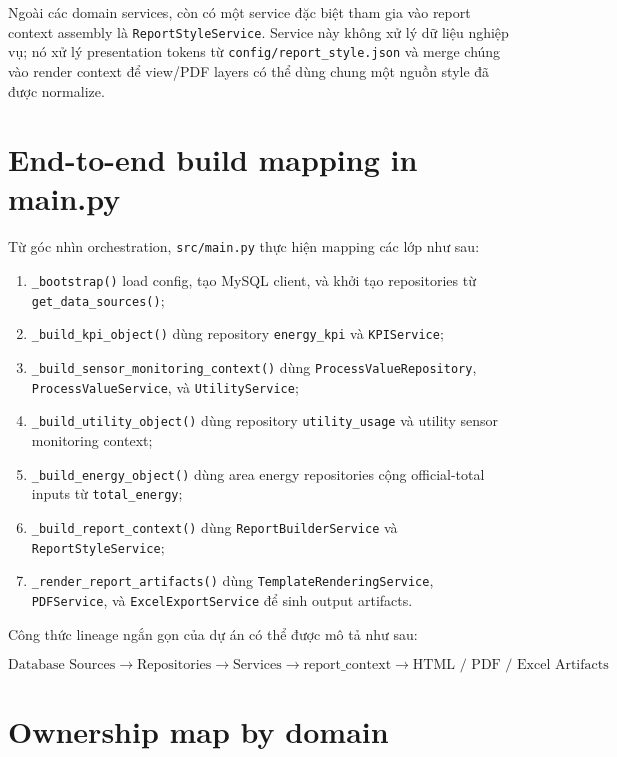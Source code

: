 Ngoài các domain services, còn có một service đặc biệt tham gia vào report context assembly là \texttt{ReportStyleService}. Service này không xử lý dữ liệu nghiệp vụ; nó xử lý presentation tokens từ \texttt{config/report\_style.json} và merge chúng vào render context để view/PDF layers có thể dùng chung một nguồn style đã được normalize.

\section{End-to-end build mapping in main.py}

Từ góc nhìn orchestration, \texttt{src/main.py} thực hiện mapping các lớp như sau:

\begin{enumerate}[label=-]
\item \texttt{\_bootstrap()} load config, tạo MySQL client, và khởi tạo repositories từ \texttt{get\_data\_sources()};
\item \texttt{\_build\_kpi\_object()} dùng repository \texttt{energy\_kpi} và \texttt{KPIService};
\item \texttt{\_build\_sensor\_monitoring\_context()} dùng \texttt{ProcessValueRepository}, \texttt{ProcessValueService}, và \texttt{UtilityService};
\item \texttt{\_build\_utility\_object()} dùng repository \texttt{utility\_usage} và utility sensor monitoring context;
\item \texttt{\_build\_energy\_object()} dùng area energy repositories cộng official-total inputs từ \texttt{total\_energy};
\item \texttt{\_build\_report\_context()} dùng \texttt{ReportBuilderService} và \texttt{ReportStyleService};
\item \texttt{\_render\_report\_artifacts()} dùng \texttt{TemplateRenderingService}, \texttt{PDFService}, và \texttt{ExcelExportService} để sinh output artifacts.
\end{enumerate}

Công thức lineage ngắn gọn của dự án có thể được mô tả như sau:

\begin{equation}
	\text{Database Sources} \rightarrow \text{Repositories} \rightarrow \text{Services} \rightarrow \text{report\_context} \rightarrow \text{HTML / PDF / Excel Artifacts}
	\label{eq:data_lineage}
\end{equation}

\section{Ownership map by domain}

